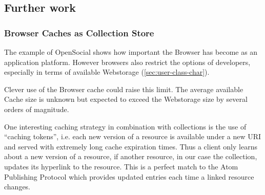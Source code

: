 \documentclass[12pt,a4paper,twoside]{scrartcl}		%
\begin{document}




\subsection{Further work}
\label{sec:further-work}

\subsubsection{Browser Caches as Collection Store}
\label{sec:browser-caches-as}

The example of OpenSocial shows how important the Browser has become as an
application platform. However browsers also restrict the options of developers,
especially in terms of available Webstorage (\autoref{sec:user-class-char}).

Clever use of the Browser cache could raise this limit. The average available
Cache size is unknown but expected to exceed the Webstorage size by several
orders of magnitude.

One interesting caching strategy in combination with collections is the use of
``caching tokens'', i.e. each new version of a resource is available under a new
URI and served with extremely long cache expiration times. Thus a client only
learns about a new version of a resource, if another resource, in our case the
collection, updates its hyperlink to the resource. This is a perfect match to
the Atom Publishing Protocol which provides updated entries each time a linked
resource changes.
\end{document}
